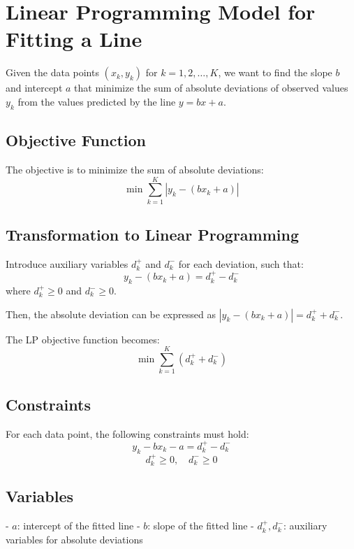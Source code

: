 \documentclass{article}
\begin{document}
\section*{Linear Programming Model for Fitting a Line}

Given the data points \((x_k, y_k)\) for \(k = 1, 2, \ldots, K\), we want to find the slope \(b\) and intercept \(a\) that minimize the sum of absolute deviations of observed values \(y_k\) from the values predicted by the line \( y = bx + a \).

\subsection*{Objective Function}
The objective is to minimize the sum of absolute deviations:
\[
\min \sum_{k=1}^{K} |y_k - (bx_k + a)|
\]

\subsection*{Transformation to Linear Programming}
Introduce auxiliary variables \(d_k^+\) and \(d_k^-\) for each deviation, such that:
\[
y_k - (bx_k + a) = d_k^+ - d_k^-
\]
where \(d_k^+ \geq 0\) and \(d_k^- \geq 0\).

Then, the absolute deviation can be expressed as \( |y_k - (bx_k + a)| = d_k^+ + d_k^- \).

The LP objective function becomes:
\[
\min \sum_{k=1}^{K} (d_k^+ + d_k^-)
\]

\subsection*{Constraints}
For each data point, the following constraints must hold:
\[
y_k - bx_k - a = d_k^+ - d_k^- 
\]
\[
d_k^+ \geq 0, \quad d_k^- \geq 0
\]

\subsection*{Variables}
- \( a \): intercept of the fitted line
- \( b \): slope of the fitted line
- \( d_k^+, d_k^- \): auxiliary variables for absolute deviations
\end{document}
